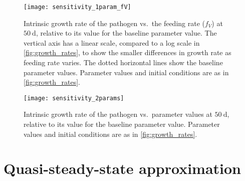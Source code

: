 \documentclass{article}
\begin{document}
\begin{figure}
  \centering
  \texttt{[image: sensitivity\_1param\_fV]}
  \caption{Intrinsic growth rate of the pathogen vs.~the feeding rate
    ($f_V$) at $50~\text{d}$, relative to its value for the baseline
    parameter value.  The vertical axis has a linear scale, compared
    to a log scale in \autoref{fig:growth_rates}, to show the smaller
    differences in growth rate as feeding rate varies.  The dotted
    horizontal lines show the baseline parameter values.  Parameter
    values and initial conditions are as in
    \autoref{fig:growth_rates}.}
  \label{fig:sensitivity_1param_fV}
\end{figure}

\begin{figure}
  \centering
  \texttt{[image: sensitivity\_2params]}
  \caption{Intrinsic growth rate of the pathogen vs.~parameter values
    at $50~\text{d}$, relative to its value for the baseline
    parameter value.  Parameter values and
    initial conditions are as in \autoref{fig:growth_rates}.}
  \label{fig:sensitivity_2params}
\end{figure}


\clearpage
\appendix
\section{Quasi-steady-state approximation}
\label{sec:QSSA}
\end{document}
